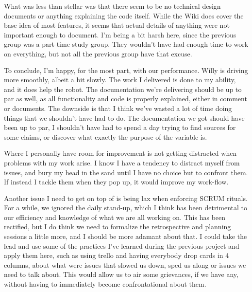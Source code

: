 What was less than stellar was that there seem to be no technical design documents or anything explaining the code itself.
While the Wiki does cover the base idea of most features, it seems that actual details of anything were not important enough to document.
I'm being a bit harsh here, since the previous group was a part-time study group.
They wouldn't have had enough time to work on everything, but not all the previous group have that excuse.

To conclude, I'm happy, for the most part, with our performance.
Willy is driving more smoothly, albeit a bit slowly.
The work I delivered is done to my ability, and it does help the robot.
The documentation we're delivering should be up to par as well, as all functionality and code is properly explained, either in comment or documents.
The downside is that I think we've wasted a lot of time doing things that we shouldn't have had to do.
The documentation we got should have been up to par, I shouldn't have had to spend a day trying to find sources for some claims, or discover what exactly the purpose of the variable  is.

Where I personally have room for improvement is not getting distracted when problems with my work arise.
I know I have a tendency to distract myself from issues, and bury my head in the sand until I have no choice but to confront them.
If instead I tackle them when they pop up, it would improve my work-flow.

Another issue I need to get on top of is being lax when enforcing SCRUM rituals.
For a while, we ignored the daily stand-up, which I think has been detrimental to our efficiency and knowledge of what we are all working on.
This has been rectified, but I do think we need to formalize the retrospective and planning sessions a little more, and I should be more adamant about that.
I could take the lead and use some of the practices I've learned during the previous project and apply them here, such as using trello and having everybody drop cards in 4 columns, about what were issues that slowed us down, sped us along or issues we need to talk about.
This would allow us to air some grievances, if we have any, without having to immediately become confrontational about them.



\newpage